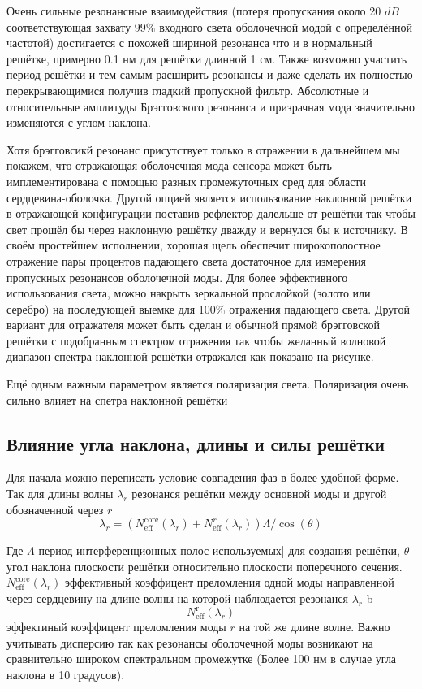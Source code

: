Очень сильные  резонансные взаимодействия (потеря пропускания около 20 $dB$ соответствующая захвату  $ 99\%   $ входного света оболочечной модой с определённой частотой) достигается с похожей шириной резонанса что и в нормальный решётке, примерно 0.1 нм для решётки длинной 1 см. Также возможно участить период решётки и тем самым расширить резонансы и даже сделать их полностью перекрывающимися получив гладкий пропускной фильтр. Абсолютные и относительные  амплитуды Брэгговского резонанса и призрачная мода значительно изменяются с углом наклона.

\par

Хотя брэгговсикй резонанс присутствует только в отражении в дальнейшем мы покажем, что отражающая оболочечная мода сенсора может быть имплементирована с помощью разных промежуточных сред для области сердцевина-оболочка. Другой опцией является использование наклонной решётки в отражающей конфигурации поставив рефлектор далельше от решётки так чтобы свет прошёл бы через наклонную решётку дважду и вернулся бы к источнику. В своём простейшем исполнении, хорошая щель обеспечит широкополостное отражение пары процентов падающего света достаточное для измерения пропускных резонансов оболочечной моды. Для более эффективного использования света, можно накрыть зеркальной прослойкой (золото или серебро) на последующей выемке для 100\% отражения падающего света. Другой вариант для отражателя может быть сделан и обычной прямой брэгговской решётки с подобранным спектром отражения так чтобы желанный волновой диапазон спектра наклонной решётки отражался как показано на рисунке.



\par 
Ещё одным важным параметром является поляризация света. Поляризация очень сильно влияет на спетра наклонной решётки


\subsection{Влияние угла наклона, длины и силы решётки}
 Для начала можно  переписать условие совпадения фаз в более удобной форме.
 Так для длины волны $ \lambda_{r} $ резонанся решётки между основной моды и другой обозначенной через $ r $
$$\lambda_{r}=\left(N_{\mathrm{eff}}^{\mathrm{core}}\left(\lambda_{r}\right)+N_{\mathrm{eff}}^{r}\left(\lambda_{r}\right)\right) \Lambda / \cos (\theta)$$

 Где $ \Lambda $ период интерференционных полос используемых] для создания решётки, $ \theta $ угол наклона плоскости решётки относительно плоскости поперечного сечения.
 $N_{\mathrm{eff}}^{\mathrm{core}}\left(\lambda_{r}\right)$ эффективный коэффицент преломления одной моды направленной через сердцевину на длине волны на которой наблюдается резонанся $ \lambda_{r} $ b $$N_{\mathrm{eff}}^{\mathrm{r}}\left(\lambda_{r}\right)$$ эффектиный коэффицент преломления моды $ r $ на той же длине волне. Важно учитывать дисперсию так как резонансы оболочечной моды возникают на сравнительно широком спектральном промежутке (Более 100 нм в случае угла наклона в 10 градусов).
 

